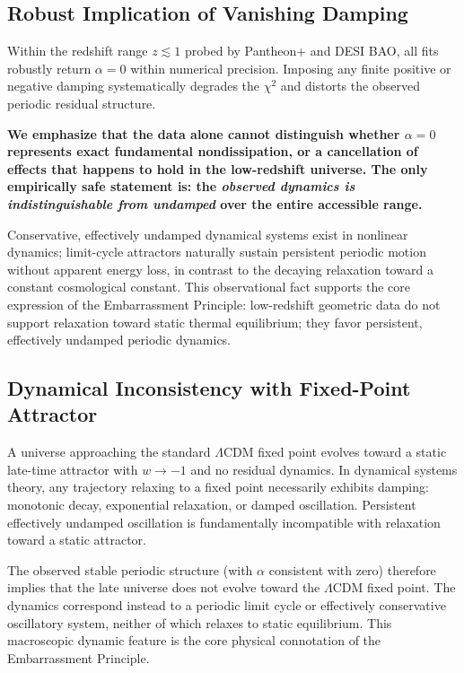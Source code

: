 \documentclass[10pt,a4paper]{article}
\begin{document}
\subsection{Robust Implication of Vanishing Damping}
Within the redshift range $z\lesssim 1$ probed by Pantheon+ and DESI BAO,
all fits robustly return $\alpha = 0$ within numerical precision.
Imposing any finite positive or negative damping
systematically degrades the $\chi^2$ and distorts the observed periodic residual structure.

\textbf{We emphasize that the data alone cannot distinguish whether $\alpha=0$ represents exact fundamental nondissipation, or a cancellation of effects that happens to hold in the low-redshift universe.
The only empirically safe statement is:
the \emph{observed dynamics is indistinguishable from undamped} over the entire accessible range.}

Conservative, effectively undamped dynamical systems exist in nonlinear dynamics; limit-cycle attractors naturally sustain persistent periodic motion without apparent energy loss, in contrast to the decaying relaxation toward a constant cosmological constant. This observational fact supports the core expression of the Embarrassment Principle:
low-redshift geometric data do not support relaxation toward static thermal equilibrium;
they favor persistent, effectively undamped periodic dynamics.

\subsection{Dynamical Inconsistency with Fixed-Point Attractor}
A universe approaching the standard $\Lambda$CDM fixed point evolves toward a static late-time attractor with $w\to -1$ and no residual dynamics.
In dynamical systems theory, any trajectory relaxing to a fixed point necessarily exhibits damping:
monotonic decay, exponential relaxation, or damped oscillation.
Persistent effectively undamped oscillation is fundamentally incompatible with relaxation toward a static attractor.

The observed stable periodic structure (with $\alpha$ consistent with zero) therefore implies that
the late universe does not evolve toward the $\Lambda$CDM fixed point.
The dynamics correspond instead to a periodic limit cycle or effectively conservative oscillatory system,
neither of which relaxes to static equilibrium. This macroscopic dynamic feature is the core physical connotation of the Embarrassment Principle.
\end{document}
